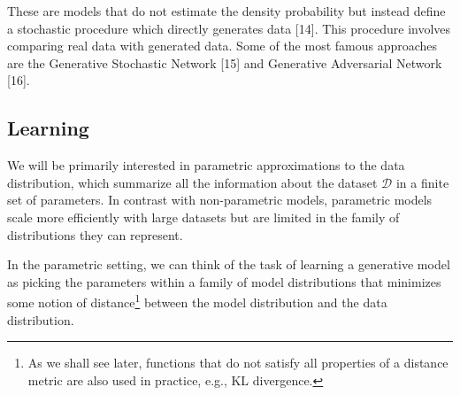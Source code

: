 These are models that do not estimate the density probability but instead define a 
stochastic procedure which directly generates data [14]. This procedure involves 
comparing real data with generated data. Some of the most famous approaches are 
the Generative Stochastic Network [15] and Generative Adversarial Network [16].


\subsection{Learning}

We will be primarily interested in parametric approximations to the data
distribution, which summarize all the information about the dataset $\mathcal{D}$ in
a finite set of parameters. In contrast with non-parametric models,
parametric models scale more efficiently with large datasets but are
limited in the family of distributions they can represent.

In the parametric setting, we can think of the task of learning a
generative model as picking the parameters within a family of model
distributions that minimizes some notion of distance\footnote{
  As we shall see later, functions that do not satisfy all 
  properties of a distance metric are also used in practice, e.g., KL
  divergence.} 
between the model distribution and the data distribution.

